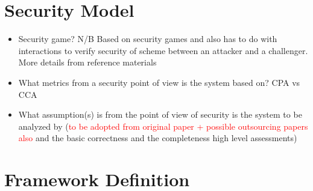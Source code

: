 \section{Security Model}

\begin{itemize}
	\item Security game? N/B Based on security games and also has to do with interactions to verify security of scheme between an attacker and a challenger. More details from reference materials
	\item What metrics from a security point of view is the system based on? CPA vs CCA
	\item What assumption(s) is from the point of view of security is the system to be analyzed by (\textcolor{red}{to be adopted from original paper + possible outsourcing papers also} and the basic correctness and the completeness high level assessments)
\end{itemize}


\section{Framework Definition}

